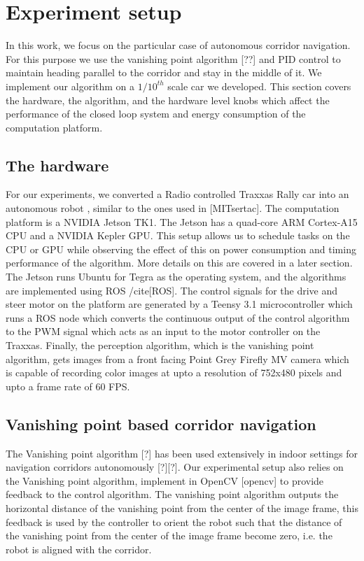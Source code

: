 \section{Experiment setup}

In this work, we focus on the particular case of autonomous corridor navigation. For this purpose we use the vanishing point algorithm [??] and PID control to maintain heading parallel to the corridor and stay in the middle of it. We implement our algorithm on a $1/10^{th}$ scale car we developed. This section covers the hardware, the algorithm, and the hardware level knobs which affect the performance of the closed loop system and energy consumption of the computation platform.

\subsection{The hardware}

For our experiments, we converted a Radio controlled Traxxas Rally car into an autonomous robot \figure{}, similar to the ones used in \cite{}[MITsertac]. The computation platform is a NVIDIA Jetson TK1. The Jetson has a quad-core ARM \textsuperscript{\textregistered} Cortex-A15 CPU and a NVIDIA Kepler GPU. This setup allows us to schedule tasks on the CPU or GPU while observing the effect of this on power consumption and timing performance of the algorithm. More details on this are covered in a later section. The Jetson runs Ubuntu for Tegra as the operating system, and the algorithms are implemented using ROS /cite{}[ROS]. The control signals for the drive and steer motor on the platform are generated by a Teensy 3.1 microcontroller which runs a ROS node which converts the continuous output of the control algorithm to the PWM signal which acts as an input to the motor controller on the Traxxas. Finally, the perception algorithm, which is the vanishing point algorithm, gets images from a front facing Point Grey Firefly MV camera which is capable of recording color images at upto a resolution of 752x480 pixels and upto a frame rate of 60 FPS.

\subsection{Vanishing point based corridor navigation}

The Vanishing point algorithm \cite{}[?] has been used extensively in indoor settings for navigation corridors autonomously \cite{}[?][?]. Our experimental setup also relies on the Vanishing point algorithm, implement in OpenCV \cite{}[opencv] to provide feedback to the control algorithm. The vanishing point algorithm outputs the horizontal distance of the vanishing point from the center of the image frame, this feedback is used by the controller to orient the robot such that the distance of the vanishing point from the center of the image frame become zero, i.e. the robot is aligned with the corridor. 

